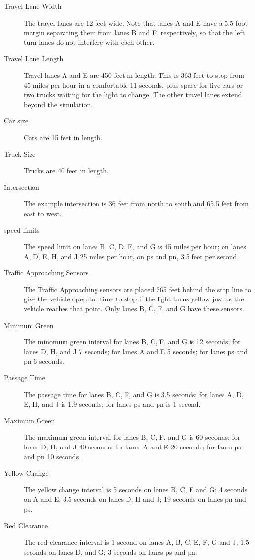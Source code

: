 \documentclass[letterpaper,twoside]{article}
\begin{document}
\begin{description}
\item[Travel Lane Width]{The travel lanes are 12 feet wide.  Note that lanes
  A and E have a 5.5-foot margin separating them from lanes B and F,
  respectively, so that the left turn lanes do not interfere with each other.}
\item[Travel Lane Length]{Travel lanes A and E are 450 feet in length.
  This is 363 feet to stop from 45 miles per hour in a comfortable 11 seconds,
  plus space for five cars or two trucks waiting for the light to change.
  The other travel lanes extend beyond the simulation.}
\item[Car size]{Cars are 15 feet in length.}
\item[Truck Size]{Trucks are 40 feet in length.}
\item[Intersection]{The example intersection is 36 feet from north to south
  and 65.5 feet from east to west.}
\item[speed limits]{The speed limit on lanes B, C, D, F, and G is
  45 miles per hour; on lanes A, D, E, H, and J 25 miles per hour,
  on ps and pn, 3.5 feet per second.}
\item[Traffic Approaching Sensors]{The Traffic Approaching sensors are placed
  365 feet behind the stop line to give the vehicle operator time to stop
  if the light turns yellow just as the vehicle reaches that point.
Only lanes B, C, F, and G have these sensors.}
\item[Minimum Green]{The minomum green interval for lanes B, C, F, and G
  is 12 seconds; for lanes D, H, and J 7 seconds; for lanes A and E 5 seconds;
  for lanes ps and pn 6 seconds.}
\item[Passage Time]{The passage time for lanes B, C, F, and G is 3.5
  seconds; for lanes A, D, E, H, and J is 1.9 seconds;
  for lanes ps and pn is 1 second.}
\item[Maximum Green]{The maximum green interval for lanes B, C, F, and G
  is 60 seconds; for lanes D, H, and J 40 seconds; for lanes A and E
  20 seconds; for lanes ps and pn 10 seconds.}
\item[Yellow Change]{The yellow change interval is 5 seconds on lanes
  B, C, F and G; 4 seconds on A and E; 3.5 seconds on lanes D, H and J;
  19 seconds on lanes pn and ps.}
\item[Red Clearance]{The red clearance interval is 1 second on lanes A, B, C,
  E, F, G and J; 1.5 seconds on lanes D, and G; 3 seconds on lanes ps and pn.}
\end{description}
\end{document}
